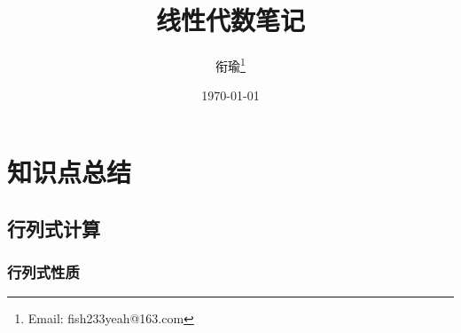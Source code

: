 \documentclass[12pt,a4paper,UTF8]{book}
\begin{document}
\frontmatter
\title{线性代数笔记}
\author{衔瑜\thanks{Email: fish233yeah@163.com}}
\date{\today}
\maketitle
\tableofcontents



\mainmatter
\setlength{\parindent}{0pt}
\chapter{知识点总结}

\section{行列式计算}
\subsection{行列式性质}
\end{document}
